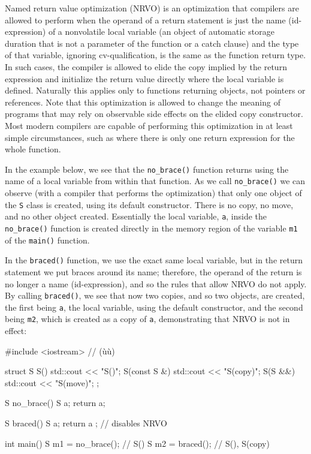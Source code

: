 Named return value optimization (NRVO) is an optimization that compilers
are allowed to perform when the operand of a return statement is just
the name (id-expression) of a nonvolatile local variable (an object of
automatic storage duration that is not a parameter of the function or a
catch clause) and the type of that variable, ignoring cv-qualification,
is the same as the function return type. In such cases, the compiler is
allowed to elide the copy implied by the return expression and
initialize the return value directly where the local variable is
defined. Naturally this applies only to functions returning objects, not
pointers or references. Note that this optimization is allowed to change
the meaning of programs that may rely on observable side effects on the
elided copy constructor. Most modern compilers are capable of performing
this optimization in at least simple circumstances, such as where there
is only one return expression for the whole function.

In the example below, we see that the \lstinline!no_brace()! function
returns using the name of a local variable from within that function. As
we call \lstinline!no_brace()! we can observe (with a compiler that
performs the optimization) that only one object of the \lstinline!S! class
is created, using its default constructor. There is no copy, no move,
and no other object created. Essentially the local variable, \lstinline!a!,
inside the \lstinline!no_brace()! function is created directly in the
memory region of the variable \lstinline!m1! of the \lstinline!main()!
function.

In the \lstinline!braced()! function, we use the exact same local variable,
but in the return statement we put braces around its name; therefore,
the operand of the return is no longer a name (id-expression), and so
the rules that allow NRVO do not apply. By calling \lstinline!braced()!, we
see that now two copies, and so two objects, are created, the first
being \lstinline!a!, the local variable, using the default constructor, and
the second being \lstinline!m2!, which is created as a copy of \lstinline!a!,
demonstrating that NRVO is not in effect:

\begin{emcppslisting}
#include <iostream>  // (ù{}ù)

struct S
{
    S()          { std::cout << "S()\n"; }
    S(const S &) { std::cout << "S(copy)\n"; }
    S(S &&)      { std::cout << "S(move)\n"; }
};

S no_brace()
{
    S a;
    return a;
}

S braced()
{
    S a;
    return { a };  // disables NRVO
}

int main()
{
    S m1 = no_brace();  // S()
    S m2 = braced();    // S(), S(copy)
}
\end{emcppslisting}
    

